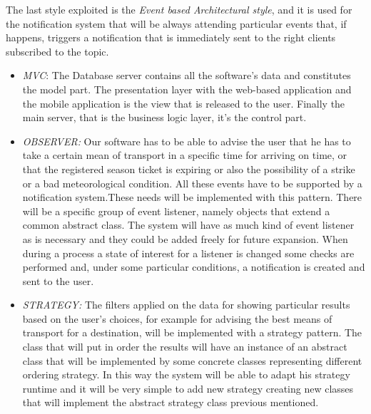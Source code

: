 The last style exploited is the \emph{Event based Architectural style}, and it is used for the notification system that will be always attending particular events that, if happens, triggers a notification that is immediately sent to the right clients subscribed to the topic. 


\begin{itemize}
	\item 
\emph{MVC}: The Database server contains all the software’s data and constitutes the model part. The presentation layer with the web-based application and the mobile application is the view that is released to the user. Finally the main server,  that is the business logic layer, it’s the control part.

\item \emph{OBSERVER:} Our software has to be able to advise the user that he has to take a certain mean of transport in a specific time for arriving on time, or that the registered season ticket is expiring or also the possibility of a strike or a bad meteorological condition. All these events have to be supported by a notification system.These needs will be implemented with this pattern.  There will be a specific group of event listener, namely objects that extend a common abstract class. The system will have as much kind of event listener as is necessary and they could be added freely for future expansion. When during a process a state of interest for a listener is changed some checks are performed and, under some particular conditions, a notification is created and sent to the user. 

\item \emph{STRATEGY:} The filters applied on the data for showing particular results based on the user’s choices, for example for advising the best means of transport for a destination, will be implemented with a strategy pattern. The class that will put in order the results will have an instance of an abstract class that will be implemented by some concrete classes representing different ordering strategy. In this way the system will be able to adapt his strategy runtime and it will be very simple to add new strategy creating new classes that will implement the abstract strategy class previous mentioned.


\end{itemize}
